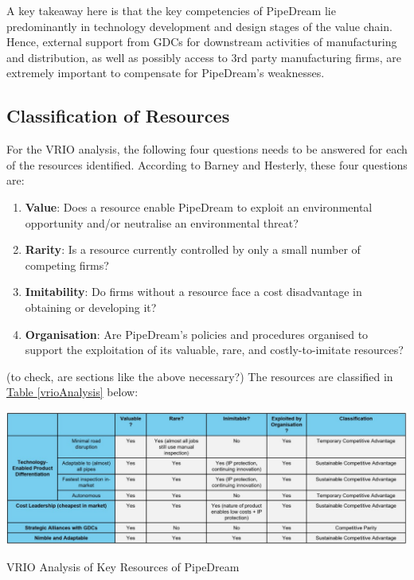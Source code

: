 \documentclass[11pt]{article}		%
\newcommand{\tableref}[1]{\hyperref[#1]{Table \ref*{#1}}}     %
\begin{document}
	\hspace*{3ex} A key takeaway here is that the key competencies of PipeDream lie predominantly in technology development and design stages of the value chain. Hence, external support from GDCs for downstream activities of manufacturing and distribution, as well as possibly access to 3rd party manufacturing firms, are extremely important to compensate for PipeDream's weaknesses. 

	
	\subsection{Classification of Resources}
    For the VRIO analysis, the following four questions needs to be answered for each of the resources identified. According to Barney and Hesterly, these four questions are:
        \begin{enumerate}
        \item \textbf{Value}: Does a resource enable PipeDream to exploit an environmental opportunity and/or neutralise an environmental threat?
        \item \textbf{Rarity}: Is a resource currently controlled by only a small number of competing firms?
        \item \textbf{Imitability}: Do firms without a resource face a cost disadvantage in obtaining or developing it?
        \item \textbf{Organisation}: Are PipeDream’s policies and procedures organised to support the exploitation of its valuable, rare, and costly-to-imitate resources?
    \end{enumerate}
    (to check, are sections like the above necessary?)
    The resources are classified in \tableref{vrioAnalysis} below: 
	                \begin{table}[H]
    					\centering
        					\includegraphics[width=\textwidth]{VRIO.jpg}
        					\caption{VRIO Analysis of Key Resources of PipeDream}
        					\label{vrioAnalysis}
			    \end{table}
\end{document}
